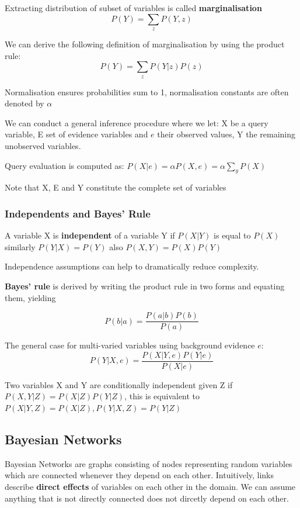 \documentclass{article}
\begin{document}
Extracting distribution of subset of variables is called \textbf{marginalisation} $$P(Y) = \sum_z P(Y, z)$$

We can derive the following definition of marginalisation by using the product rule: $$P(Y) = \sum_z P(Y|z)P(z)$$

Normalisation ensures probabilities sum to 1, normalisation constants are often denoted by $\alpha$

We can conduct a general inference procedure where we let: X be a query variable, E set of evidence variables and $e$ their observed values, Y the remaining unobserved variables. 

Query evaluation is computed as: $P(X|e) = \alpha P(X, e) = \alpha \sum_y P(X)$

Note that X, E and Y constitute the complete set of variables

\subsubsection{Independents and Bayes' Rule}

A variable X is \textbf{independent} of a variable Y if $P(X|Y)$ is equal to $P(X)$ similarly $P(Y|X) = P(Y)$ also $P(X,Y) = P(X)P(Y)$ 

Independence assumptions can help to dramatically reduce complexity. 

\textbf{Bayes' rule} is derived by writing the product rule in two forms and equating them, yielding 

$$P(b|a) = \frac{P(a|b)P(b)}{P(a)}$$

The general case for multi-varied variables using background evidence $e$: $$P(Y|X,e) = \frac{P(X|Y,e)P(Y|e)}{P(X|e)}$$

Two variables X and Y are conditionally independent given Z if $P(X,Y|Z) = P(X|Z)P(Y|Z)$, this is equivalent to $P(X|Y,Z) = P(X|Z), P(Y|X,Z) = P(Y|Z)$

\subsection{Bayesian Networks}

Bayesian Networks are graphs consisting of nodes representing random variables which are connected whenever they depend on each other. Intuitively, links describe \textbf{direct effects} of variables on each other in the domain. We can assume anything that is not directly connected does not dircetly depend on each other. \newline
\end{document}

